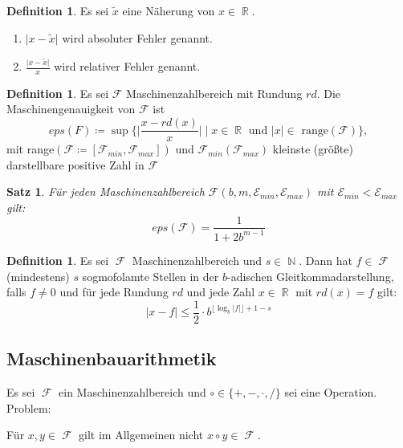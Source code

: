 \documentclass[a4paper,12pt]{article}
\DeclareMathOperator{\N}{\mathbb N}
\DeclareMathOperator{\R}{\mathbb R}
\DeclareMathOperator{\F}{\mathcal{F}}
\newtheorem{satz}[axiom]{Satz}
\theoremstyle{definition}
\newtheorem{definition}[axiom]{Definition}
\begin{document}
	\begin{definition}
		Es sei $\tilde{x}$ eine Näherung von $x \in \R$.
		\begin{enumerate}[label=(\roman*)]
			\item $\lvert x - \tilde{x}\rvert$ wird absoluter Fehler genannt.
			\item $\frac{\lvert x - \tilde{x}\rvert}{x}$ wird relativer Fehler genannt.
		\end{enumerate}
	\end{definition}
	\begin{definition}
		Es sei $\mathcal{F}$ Maschinenzahlbereich mit Rundung $rd$. Die Maschinengenauigkeit von $\mathcal{F}$ ist
		\[
			eps(F) \coloneq \sup\Big\{\Big\lvert \frac{x - rd(x)}{x}\Big\rvert \mid x \in \R \text{ und } \lvert x \rvert \in \text{ range}(\mathcal{F})\Big\},
		\]
		mit range$(\mathcal{F} \coloneq [\mathcal{F}_{min}, \mathcal{F}_{max}])$ und $\mathcal{F}_{min} (\mathcal{F}_{max})$ kleinste (größte) darstellbare positive Zahl in $\mathcal{F}$
	\end{definition}
	
	\begin{satz}
		Für jeden Maschinenzahlbereich $\mathcal{F}(b,m,\mathcal{E}_{min},\mathcal{E}_{max})$ mit $\mathcal{E}_{min} < \mathcal{E}_{max}$ gilt:
		\[
			eps(\mathcal{F}) = \frac{1}{1 + 2b^{m-1}}
		\]
	\end{satz}
	\begin{definition}
		Es sei $\F$ Maschinenzahlbereich und $s \in \N$. Dann hat $f \in \F$ (mindestens) $s$ sogmofolamte Stellen in der $b$-adischen Gleitkommadarstellung, falls $f \neq 0$ und für jede Rundung $rd$ und jede Zahl 
		$x \in \R$ mit $rd(x) = f$ gilt:
		\[
			\lvert x - f\rvert \leq \frac{1}{2} \cdot b^{\lfloor \log_b \lvert f\rvert \rfloor + 1 - s}
		\]
	\end{definition}
	\subsection{Maschinenbauarithmetik}
	Es sei $\F$ ein Maschinenzahlbereich und $\circ \in \{+,-,\cdot,/\}$ sei eine Operation. Problem:
	
	Für $x,y \in \F$ gilt im Allgemeinen nicht $x \circ y \in \F$.
	
\end{document}
